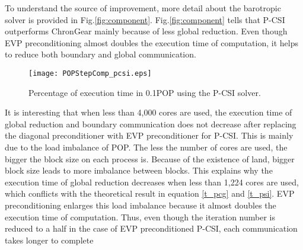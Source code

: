 To understand the source of improvement, more detail about the barotropic solver is provided in Fig.\ref{fig:component}.
Fig.\ref{fig:component} tells that P-CSI outperforms ChronGear mainly because of less global reduction. 
Even though EVP preconditioning almost doubles the execution time of computation, it helps to reduce both boundary and global communication. 
\begin {figure}
\centering
\texttt{[image: POPStepComp\_pcsi.eps]}
\caption[] {Percentage of execution time in 0.1\degree POP using the P-CSI solver.\label{fig:StepComp_pcsi}}
\end{figure}
It is interesting that when less than 4,000 cores are used, the execution time of global reduction and boundary communication does not decrease after replacing the diagonal preconditioner with EVP preconditioner for P-CSI. 
This is mainly due to the load imbalance of POP. 
The less the number of cores are used, the bigger the block size on each process is. 
Because of the existence of land, bigger block size leads to more imbalance between blocks.   
This explains why the execution time of global reduction decreases when less than 1,224 cores are used, which conflicts with the theoretical result in equation \ref{t_pcg} and \ref{t_psi}. 
EVP preconditioning enlarges this load imbalance because it almost doubles the execution time of computation.
Thus, even though the iteration number is reduced to a half in the case of EVP preconditioned P-CSI, each communication takes longer to complete 
 

